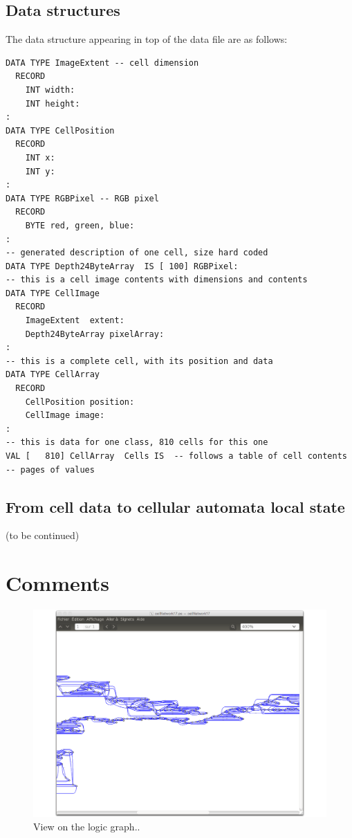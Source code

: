 \subsection {Data structures }

The data structure appearing in top of the data file are as follows:
\begin{lstlisting}
DATA TYPE ImageExtent -- cell dimension
  RECORD
    INT width:
    INT height:
:
DATA TYPE CellPosition
  RECORD
    INT x:
    INT y:
:
DATA TYPE RGBPixel -- RGB pixel
  RECORD
    BYTE red, green, blue:
:
-- generated description of one cell, size hard coded
DATA TYPE Depth24ByteArray  IS [ 100] RGBPixel:
-- this is a cell image contents with dimensions and contents
DATA TYPE CellImage
  RECORD
    ImageExtent  extent:
    Depth24ByteArray pixelArray:
:
-- this is a complete cell, with its position and data
DATA TYPE CellArray
  RECORD
    CellPosition position:
    CellImage image:
:
-- this is data for one class, 810 cells for this one
VAL [   810] CellArray  Cells IS  -- follows a table of cell contents
-- pages of values
\end{lstlisting}


\subsection {From cell data to cellular automata local state }

(to be continued)






\section { Comments}

\begin{figure}[hbtp]
\begin{center} 
\includegraphics[width=12cm]{Diego2Networks.pdf}
\caption{View on the logic graph..}
\label{fig:antisrananaClass17bis}
\end{center}
\end{figure}


